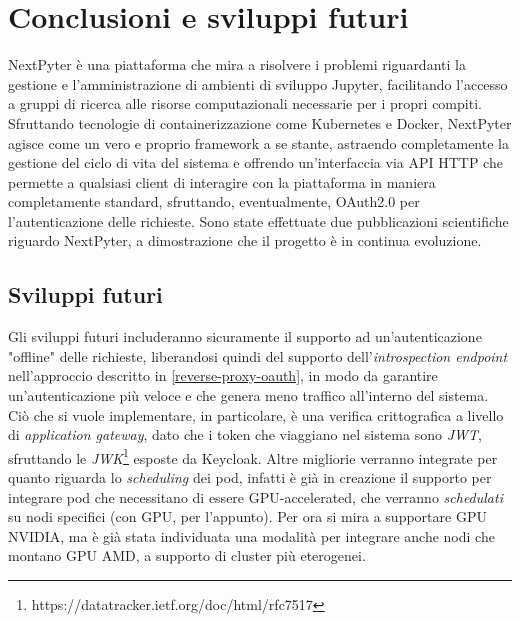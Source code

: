 \chapter{Conclusioni e sviluppi futuri}
NextPyter è una piattaforma che mira a risolvere i problemi riguardanti la gestione e l'amministrazione di ambienti di sviluppo Jupyter, facilitando l'accesso a gruppi di ricerca alle risorse computazionali necessarie per i propri compiti.
\newline
Sfruttando tecnologie di containerizzazione come Kubernetes e Docker, NextPyter agisce come un vero e proprio framework a se stante, astraendo completamente la gestione del ciclo di vita del sistema e offrendo un'interfaccia via API HTTP che permette a qualsiasi client di interagire con la piattaforma in maniera completamente standard, sfruttando, eventualmente, OAuth2.0 per l'autenticazione delle richieste.
\newline
Sono state effettuate due pubblicazioni scientifiche\cite{nextpyter-work-1}\cite{nextpyter-work-2} riguardo NextPyter, a dimostrazione che il progetto è in continua evoluzione.

\section{Sviluppi futuri}
Gli sviluppi futuri includeranno sicuramente il supporto ad un'autenticazione "offline" delle richieste, liberandosi quindi del supporto dell'\textit{introspection endpoint} nell'approccio descritto in \ref{reverse-proxy-oauth}, in modo da garantire un'autenticazione più veloce e che genera meno traffico all'interno del sistema. Ciò che si vuole implementare, in particolare, è una verifica crittografica a livello di \textit{application gateway}, dato che i token che viaggiano nel sistema sono \textit{JWT}, sfruttando le \textit{JWK}\footnote{https://datatracker.ietf.org/doc/html/rfc7517} esposte da Keycloak.
\newline
Altre migliorie verranno integrate per quanto riguarda lo \textit{scheduling} dei pod, infatti è già in creazione il supporto per integrare pod che necessitano di essere GPU-accelerated, che verranno \textit{schedulati} su nodi specifici (con GPU, per l'appunto). Per ora si mira a supportare GPU NVIDIA, ma è già stata individuata una modalità per integrare anche nodi che montano GPU AMD, a supporto di cluster più eterogenei.